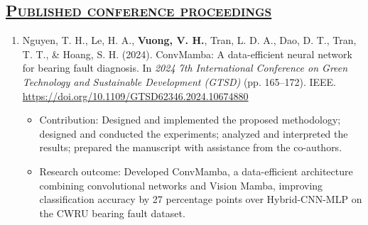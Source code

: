 \documentclass[a4paper,12pt]{article}
\begin{document}
\subsection*{\scshape\underline{Published conference proceedings}}
\begin{enumerate}[
    leftmargin=*,
    labelsep=0.5em,
    align=left
]

  \item
  Nguyen, T. H., Le, H. A., \textbf{Vuong, V. H.}, Tran, L. D. A.,
  Dao, D. T., Tran, T. T., \& Hoang, S. H. (2024).
  ConvMamba: A data-efficient neural network for bearing fault diagnosis.
  In \textit{2024 7th International Conference on Green Technology and Sustainable Development (GTSD)}
  (pp. 165--172). IEEE.
  \href{https://doi.org/10.1109/GTSD62346.2024.10674880}
  {https://doi.org/10.1109/GTSD62346.2024.10674880}

\begin{itemize}[leftmargin=1.5em]

    \item Contribution: Designed and implemented the proposed methodology; designed and conducted the experiments; analyzed and
    interpreted the results; prepared the manuscript with assistance from the co-authors.
    \item Research outcome: Developed ConvMamba, a data-efficient
    architecture combining convolutional networks and Vision Mamba,
    improving classification accuracy by 27 percentage points over
    Hybrid-CNN-MLP on the CWRU bearing fault dataset.

\end{itemize}

\end{enumerate}
\end{document}
